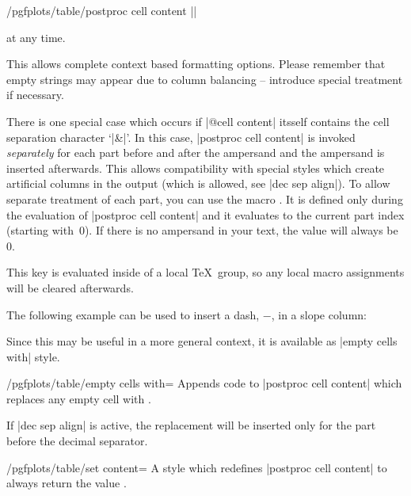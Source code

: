 \begin{codekey}{/pgfplots/table/postproc cell content}
	|| 

	at any time.
	
	This allows complete context based formatting options. Please remember that empty strings may appear due to column balancing -- introduce special treatment if necessary.

	There is one special case which occurs if |@cell content| itsself contains the cell separation character `|&|'. In this case, |postproc cell content| is invoked \emph{separately} for each part before and after the ampersand and the ampersand is inserted afterwards. This allows compatibility with special styles which create artificial columns in the output (which is allowed, see |dec sep align|). To allow separate treatment of each part, you can use the macro \declareandlabel{\pgfplotstablepartno}. It is defined only during the evaluation of |postproc cell content| and it evaluates to the current part index (starting with~$0$). If there is no ampersand in your text, the value will always be~$0$.

	This key is evaluated inside of a local \TeX\ group, so any local macro assignments will be cleared afterwards.

	The following example can be used to insert a dash, $-$, in a slope column:
\begin{codeexample}[]

\end{codeexample}
Since this may be useful in a more general context, it is available as |empty cells with| style.
\end{codekey}

\begin{stylekey}{/pgfplots/table/empty cells with=}
	Appends code to |postproc cell content| which replaces any empty cell with .

	If |dec sep align| is active, the replacement will be inserted only for the part before the decimal separator.
\end{stylekey}

\begin{stylekey}{/pgfplots/table/set content=}
	A style which redefines |postproc cell content| to always return the value .
\end{stylekey}

